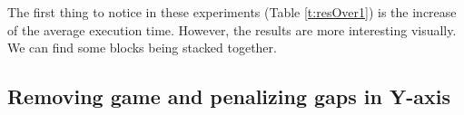 \documentclass[sigconf]{acmart}
\begin{document}
The first thing to notice in these experiments (Table \ref{t:resOver1}) is the 
increase of the average execution time.
However, the results are more interesting visually. We can find some blocks 
being stacked together.


\subsection{Removing game and penalizing gaps in Y-axis}\label{E5}
\end{document}
